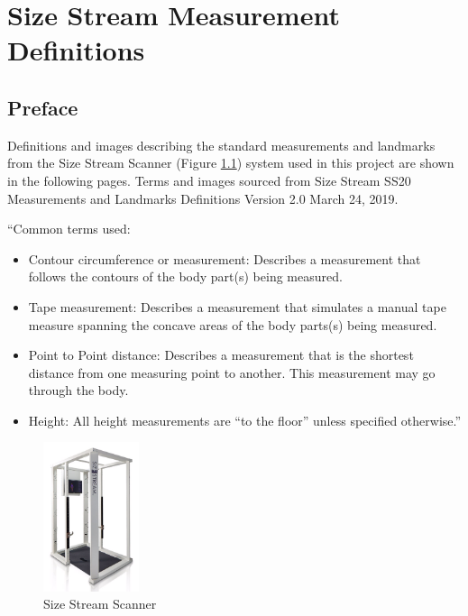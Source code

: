 \chapter{Size Stream Measurement Definitions}
\section{Preface}

Definitions and images describing the standard measurements and landmarks from the Size Stream Scanner (Figure \ref{fig:SS scanner}) system used in this project are shown in the following pages. Terms and images sourced from Size Stream SS20 Measurements and Landmarks Definitions Version 2.0 March 24, 2019.

``Common terms used:

\begin{itemize}
    \item Contour circumference or measurement: Describes a measurement that follows the contours of the body part(s) being measured.
    \item Tape measurement: Describes a measurement that simulates a manual tape measure spanning the concave areas of the body parts(s) being measured.
    \item Point to Point distance: Describes a measurement that is the shortest distance from one measuring point to another. This measurement may go through the body.
    \item Height: All height measurements are “to the floor” unless specified otherwise.''
\end{itemize}

\begin{figure} [H]
    \centering
    \includegraphics[width = 0.25\textwidth]{Images/SS scanner.png}
    \caption{Size Stream Scanner}
    \label{fig:SS scanner}
\end{figure}

